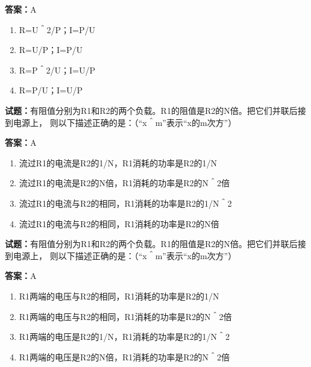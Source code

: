 \documentclass{ctexbook}
\begin{document}
\textbf{答案：}A 

\begin{enumerate}[leftmargin=3em]
  \item R=U＾2/P；I=P/U 

  \item R=U/P；I=P/U 

  \item R=P＾2/U；I=U/P 

  \item R=P/U；I=U/P 

\end{enumerate}





\vspace{1em}

\textbf{试题：}有阻值分别为R1和R2的两个负载。R1的阻值是R2的N倍。把它们并联后接到电源上，
则以下描述正确的是：（“x＾m”表示“x的m次方”） 

\textbf{答案：}A 

\begin{enumerate}[leftmargin=3em]
  \item 流过R1的电流是R2的1/N，R1消耗的功率是R2的1/N 


  \item 流过R1的电流是R2的N倍，R1消耗的功率是R2的N＾2倍 

  \item 流过R1的电流与R2的相同，R1消耗的功率是R2的1/N＾2 

  \item 流过R1的电流与R2的相同，R1消耗的功率是R2的N倍 

\end{enumerate}





\vspace{1em}

\textbf{试题：}有阻值分别为R1和R2的两个负载。R1的阻值是R2的N倍。把它们并联后接到电源上，
则以下描述正确的是：（“x＾m”表示“x的m次方”） 

\textbf{答案：}A 

\begin{enumerate}[leftmargin=3em]
  \item R1两端的电压与R2的相同，R1消耗的功率是R2的1/N 

  \item R1两端的电压与R2的相同，R1消耗的功率是R2的N＾2倍 

  \item R1两端的电压是R2的1/N，R1消耗的功率是R2的1/N＾2 

  \item R1两端的电压是R2的N倍，R1消耗的功率是R2的N＾2倍 

\end{enumerate}
\end{document}
